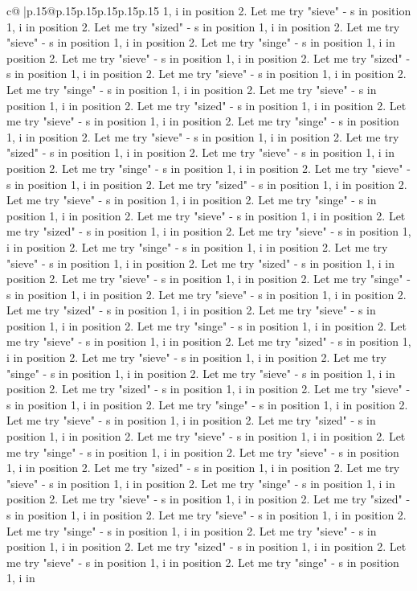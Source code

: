 \documentclass{article}
\begin{document}
{\begin{supertabular}{c@{$\;$}|p{.15\linewidth}@{}p{.15\linewidth}p{.15\linewidth}p{.15\linewidth}p{.15\linewidth}p{.15\linewidth}}
{{{1, i in position 2. Let me try "sieve" {-} s in position 1, i in position 2. Let me try "sized" {-} s in position 1, i in position 2. Let me try "sieve" {-} s in position 1, i in position 2. Let me try "singe" {-} s in position 1, i in position 2. Let me try "sieve" {-} s in position 1, i in position 2. Let me try "sized" {-} s in position 1, i in position 2. Let me try "sieve" {-} s in position 1, i in position 2. Let me try "singe" {-} s in position 1, i in position 2. Let me try "sieve" {-} s in position 1, i in position 2. Let me try "sized" {-} s in position 1, i in position 2. Let me try "sieve" {-} s in position 1, i in position 2. Let me try "singe" {-} s in position 1, i in position 2. Let me try "sieve" {-} s in position 1, i in position 2. Let me try "sized" {-} s in position 1, i in position 2. Let me try "sieve" {-} s in position 1, i in position 2. Let me try "singe" {-} s in position 1, i in position 2. Let me try "sieve" {-} s in position 1, i in position 2. Let me try "sized" {-} s in position 1, i in position 2. Let me try "sieve" {-} s in position 1, i in position 2. Let me try "singe" {-} s in position 1, i in position 2. Let me try "sieve" {-} s in position 1, i in position 2. Let me try "sized" {-} s in position 1, i in position 2. Let me try "sieve" {-} s in position 1, i in position 2. Let me try "singe" {-} s in position 1, i in position 2. Let me try "sieve" {-} s in position 1, i in position 2. Let me try "sized" {-} s in position 1, i in position 2. Let me try "sieve" {-} s in position 1, i in position 2. Let me try "singe" {-} s in position 1, i in position 2. Let me try "sieve" {-} s in position 1, i in position 2. Let me try "sized" {-} s in position 1, i in position 2. Let me try "sieve" {-} s in position 1, i in position 2. Let me try "singe" {-} s in position 1, i in position 2. Let me try "sieve" {-} s in position 1, i in position 2. Let me try "sized" {-} s in position 1, i in position 2. Let me try "sieve" {-} s in position 1, i in position 2. Let me try "singe" {-} s in position 1, i in position 2. Let me try "sieve" {-} s in position 1, i in position 2. Let me try "sized" {-} s in position 1, i in position 2. Let me try "sieve" {-} s in position 1, i in position 2. Let me try "singe" {-} s in position 1, i in position 2. Let me try "sieve" {-} s in position 1, i in position 2. Let me try "sized" {-} s in position 1, i in position 2. Let me try "sieve" {-} s in position 1, i in position 2. Let me try "singe" {-} s in position 1, i in position 2. Let me try "sieve" {-} s in position 1, i in position 2. Let me try "sized" {-} s in position 1, i in position 2. Let me try "sieve" {-} s in position 1, i in position 2. Let me try "singe" {-} s in position 1, i in position 2. Let me try "sieve" {-} s in position 1, i in position 2. Let me try "sized" {-} s in position 1, i in position 2. Let me try "sieve" {-} s in position 1, i in position 2. Let me try "singe" {-} s in position 1, i in position 2. Let me try "sieve" {-} s in position 1, i in position 2. Let me try "sized" {-} s in position 1, i in position 2. Let me try "sieve" {-} s in position 1, i in position 2. Let me try "singe" {-} s in position 1, i in }}}
\end{supertabular}}
\end{document}
